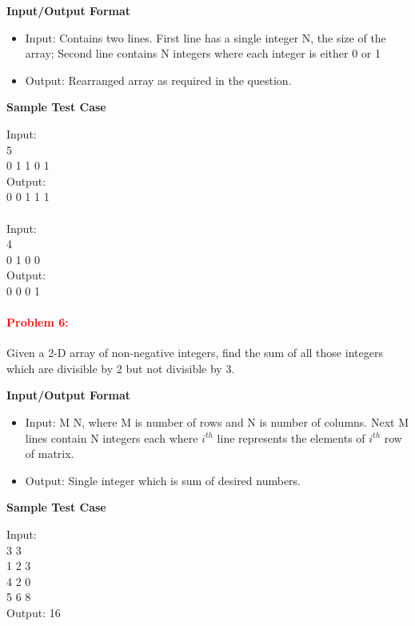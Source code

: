 \documentclass[a4paper,11pt]{article} %
\begin{document}
\textbf{Input/Output Format}
\begin{itemize}
    \item  Input: Contains two lines. First line has a single integer N, the size of the array; Second line contains N integers where each integer is either 0 or 1
    \item  Output: Rearranged array as required in the question.
\end{itemize}

\textbf{Sample Test Case}

Input:\\
5 \\
0 1 1 0 1  \\
Output:\\
0 0 1 1 1 \\
\\
Input:\\
4\\
0 1 0 0 \\
Output:\\
0 0 0 1 \\

\vspace*{0.3cm}
\paragraph{\textcolor{red}{Problem 6: }}
Given a 2-D array of non-negative integers, find the sum of all those integers which are divisible by 2 but not divisible by 3.

\textbf{Input/Output Format}
\begin{itemize}
    \item  Input: M N, where M is number of rows and N is number of columns. Next M lines contain N integers each where $i^{th}$ line represents the elements of  $i^{th}$ row of matrix.
    \item  Output: Single integer which is sum of desired numbers.
\end{itemize}

\textbf{Sample Test Case}

Input:\\
3 3\\
1 2 3\\
4 2 0\\
5 6 8\\
Output: 16\\

\vspace*{0.3cm}
\end{document}
